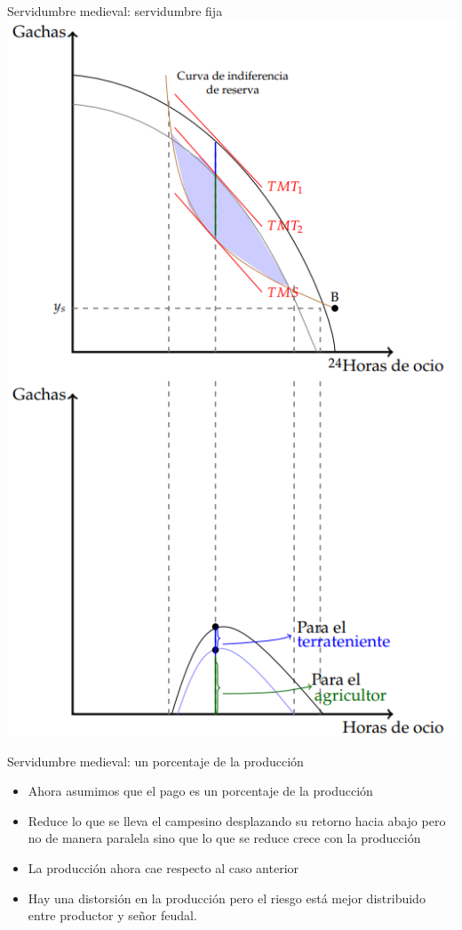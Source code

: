 \documentclass{beamer}
\begin{document}
\begin{frame}{Servidumbre medieval: servidumbre fija}
    \centering
    \includegraphics[scale=0.45]{../Figures/C19.12.png}
\end{frame}

\begin{frame}{Servidumbre medieval: un porcentaje de la producción}
    \begin{itemize}
        \item Ahora asumimos que el pago es un porcentaje de la producción 
        \item Reduce lo que se lleva el campesino desplazando su retorno hacia abajo pero no de manera paralela sino que lo que se reduce crece con la producción
        \item La producción ahora cae respecto al caso anterior
        \item Hay una distorsión en la producción pero el riesgo está mejor distribuido entre productor y señor feudal. 
    \end{itemize}
\end{frame}
\end{document}
